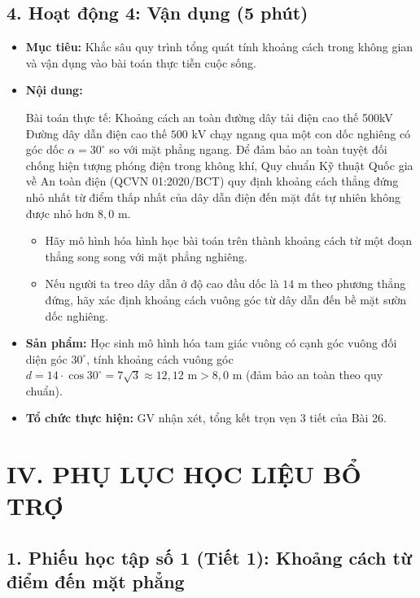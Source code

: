\documentclass[12pt, a4paper]{article}
\begin{document}
\begin{itemize}[leftmargin=1.2cm]
\subsection*{4. Hoạt động 4: Vận dụng (5 phút)}

\begin{itemize}[leftmargin=1.2cm]
    \item[a)] \textbf{Mục tiêu:} Khắc sâu quy trình tổng quát tính khoảng cách trong không gian và vận dụng vào bài toán thực tiễn cuộc sống.
    \item[b)] \textbf{Nội dung:}
    \begin{stembox}{Bài toán thực tế: Khoảng cách an toàn đường dây tải điện cao thế 500kV}
        Đường dây dẫn điện cao thế $500\text{ kV}$ chạy ngang qua một con dốc nghiêng có góc dốc $\alpha = 30^\circ$ so với mặt phẳng ngang. Để đảm bảo an toàn tuyệt đối chống hiện tượng phóng điện trong không khí, Quy chuẩn Kỹ thuật Quốc gia về An toàn điện (QCVN 01:2020/BCT) quy định khoảng cách thẳng đứng nhỏ nhất từ điểm thấp nhất của dây dẫn điện đến mặt đất tự nhiên không được nhỏ hơn $8{,}0\text{ m}$.
        \begin{itemize}[leftmargin=0.6cm]
            \item Hãy mô hình hóa hình học bài toán trên thành khoảng cách từ một đoạn thẳng song song với mặt phẳng nghiêng.
            \item Nếu người ta treo dây dẫn ở độ cao đầu dốc là $14\text{ m}$ theo phương thẳng đứng, hãy xác định khoảng cách vuông góc từ dây dẫn đến bề mặt sườn dốc nghiêng.
        \end{itemize}
    \end{stembox}
    \item[c)] \textbf{Sản phẩm:} Học sinh mô hình hóa tam giác vuông có cạnh góc vuông đối diện góc $30^\circ$, tính khoảng cách vuông góc $d = 14 \cdot \cos 30^\circ = 7\sqrt{3} \approx 12{,}12\text{ m} > 8{,}0\text{ m}$ (đảm bảo an toàn theo quy chuẩn).
    \item[d)] \textbf{Tổ chức thực hiện:} GV nhận xét, tổng kết trọn vẹn 3 tiết của Bài 26.
\end{itemize}

\section*{IV. PHỤ LỤC HỌC LIỆU BỔ TRỢ}

\subsection*{1. Phiếu học tập số 1 (Tiết 1): Khoảng cách từ điểm đến mặt phẳng}


\end{itemize}
\end{document}
